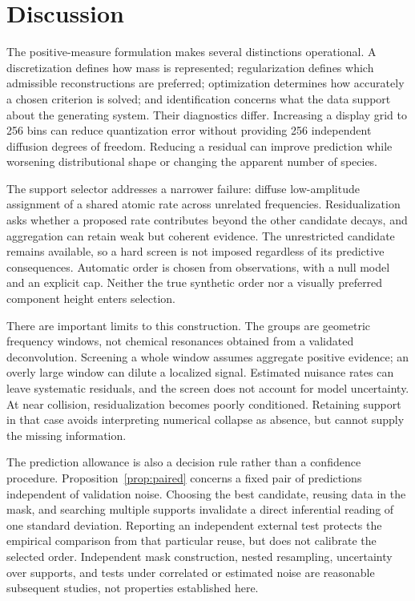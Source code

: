 \FloatBarrier
\section{Discussion}
The positive-measure formulation makes several distinctions operational. A discretization defines how mass is represented; regularization defines which admissible reconstructions are preferred; optimization determines how accurately a chosen criterion is solved; and identification concerns what the data support about the generating system. Their diagnostics differ. Increasing a display grid to 256 bins can reduce quantization error without providing 256 independent diffusion degrees of freedom. Reducing a residual can improve prediction while worsening distributional shape or changing the apparent number of species.

The support selector addresses a narrower failure: diffuse low-amplitude assignment of a shared atomic rate across unrelated frequencies. Residualization asks whether a proposed rate contributes beyond the other candidate decays, and aggregation can retain weak but coherent evidence. The unrestricted candidate remains available, so a hard screen is not imposed regardless of its predictive consequences. Automatic order is chosen from observations, with a null model and an explicit cap. Neither the true synthetic order nor a visually preferred component height enters selection.

There are important limits to this construction. The groups are geometric frequency windows, not chemical resonances obtained from a validated deconvolution. Screening a whole window assumes aggregate positive evidence; an overly large window can dilute a localized signal. Estimated nuisance rates can leave systematic residuals, and the screen does not account for model uncertainty. At near collision, residualization becomes poorly conditioned. Retaining support in that case avoids interpreting numerical collapse as absence, but cannot supply the missing information.

The prediction allowance is also a decision rule rather than a confidence procedure. Proposition~\ref{prop:paired} concerns a fixed pair of predictions independent of validation noise. Choosing the best candidate, reusing data in the mask, and searching multiple supports invalidate a direct inferential reading of one standard deviation. Reporting an independent external test protects the empirical comparison from that particular reuse, but does not calibrate the selected order. Independent mask construction, nested resampling, uncertainty over supports, and tests under correlated or estimated noise are reasonable subsequent studies, not properties established here.

